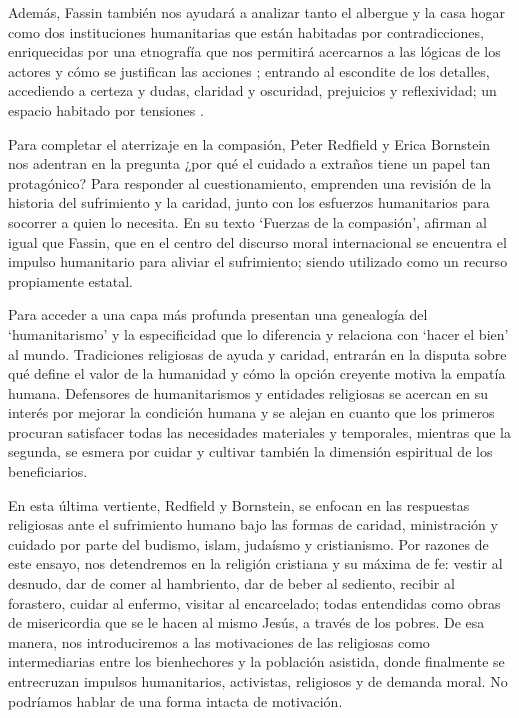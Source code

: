 \documentclass[
  spanish,
  11pt,
  a4paper,
]{scrbook}
\begin{document}
Además, Fassin también nos ayudará a analizar tanto el albergue y la
casa hogar como dos instituciones humanitarias que están habitadas por
contradicciones, enriquecidas por una etnografía que nos permitirá
acercarnos a las lógicas de los actores y cómo se justifican las
acciones \autocite[25]{Fassin2016}; entrando al escondite de los
detalles, accediendo a certeza y dudas, claridad y oscuridad, prejuicios
y reflexividad; un espacio habitado por tensiones
\autocite[28]{Fassin2016}.

Para completar el aterrizaje en la compasión, Peter Redfield y Erica
Bornstein \autocite*{Redfield2011} nos adentran en la pregunta ¿por qué
el cuidado a extraños tiene un papel tan protagónico? Para responder al
cuestionamiento, emprenden una revisión de la historia del sufrimiento y
la caridad, junto con los esfuerzos humanitarios para socorrer a quien
lo necesita. En su texto `Fuerzas de la compasión', afirman al igual que
Fassin, que en el centro del discurso moral internacional se encuentra
el impulso humanitario para aliviar el sufrimiento; siendo utilizado
como un recurso propiamente estatal.

Para acceder a una capa más profunda presentan una genealogía del
`humanitarismo' y la especificidad que lo diferencia y relaciona con
`hacer el bien' al mundo. Tradiciones religiosas de ayuda y caridad,
entrarán en la disputa sobre qué define el valor de la humanidad y cómo
la opción creyente motiva la empatía humana. Defensores de
humanitarismos y entidades religiosas se acercan en su interés por
mejorar la condición humana y se alejan en cuanto que los primeros
procuran satisfacer todas las necesidades materiales y temporales,
mientras que la segunda, se esmera por cuidar y cultivar también la
dimensión espiritual de los beneficiarios.

En esta última vertiente, Redfield y Bornstein, se enfocan en las
respuestas religiosas ante el sufrimiento humano bajo las formas de
caridad, ministración y cuidado por parte del budismo, islam, judaísmo y
cristianismo. Por razones de este ensayo, nos detendremos en la religión
cristiana y su máxima de fe: vestir al desnudo, dar de comer al
hambriento, dar de beber al sediento, recibir al forastero, cuidar al
enfermo, visitar al encarcelado; todas entendidas como obras de
misericordia que se le hacen al mismo Jesús, a través de los pobres. De
esa manera, nos introduciremos a las motivaciones de las religiosas como
intermediarias entre los bienhechores y la población asistida, donde
finalmente se entrecruzan impulsos humanitarios, activistas, religiosos
y de demanda moral. No podríamos hablar de una forma intacta de
motivación.
\end{document}
